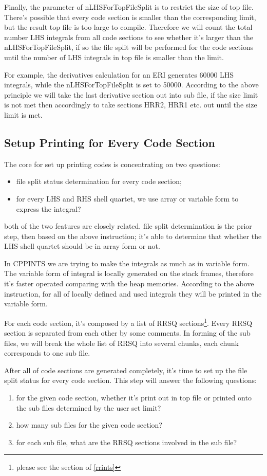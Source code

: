 Finally, the parameter of nLHSForTopFileSplit is to restrict the size of top file.
There's possible that every code section is smaller than the corresponding limit,
but the result top file is too large to compile. Therefore we will count the 
total number LHS integrals from all code sections to see whether it's larger than
the nLHSForTopFileSplit, if so the file split will be performed for the code sections
until the number of LHS integrals in top file is smaller than the limit.

For example, the derivatives calculation for an ERI generates 60000 LHS integrals, while
the nLHSForTopFileSplit is set to 50000. According to the above principle we will take
the last derivative section out into sub file, if the size limit is not met then accordingly
to take sections HRR2, HRR1 etc. out until the size limit is met.

\subsection{Setup Printing for Every Code Section}
\label{code_generation_print}

The core for set up printing codes is concentrating on two questions:
\begin{itemize}
 \item file split status determination for every code section;
 \item for every LHS and RHS shell quartet, we use array or variable
 form to express the integral?
\end{itemize}
both of the two features are closely related. file split determination
is the prior step, then based on the above instruction; it's able to 
determine that whether the LHS shell quartet should be in array form 
or not.

In CPPINTS we are trying to make the integrals as much as in variable form.
The variable form of integral is locally generated on
the stack frames, therefore it's faster operated comparing with the heap memories.
According to the above instruction, for all of locally defined and used integrals 
they will be printed in the variable form.

For each code section, it's composed by a list of RRSQ sections\footnote{please
see the section of \ref{rrints}}. Every RRSQ section is separated from 
each other by some comments. In forming of the sub files, we will break
the whole list of RRSQ into several chunks, each chunk corresponds to 
one sub file.

After all of code sections are generated completely, it's time to set up the 
file split status for every code section. This step will answer the following 
questions:
\begin{enumerate}
  \item for the given code section, whether it's print out in top file or printed 
 onto the sub files determined by the user set limit?
 \item how many sub files for the given code section? 
 \item for each sub file, what are the RRSQ sections involved in the sub file?
\end{enumerate}

